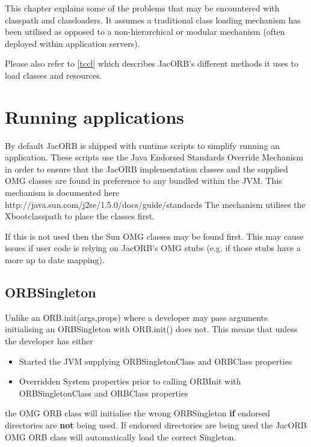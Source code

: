 %
%
\label{classloader}
This chapter explains some of the problems that may be encountered with classpath and classloaders.
It assumes a traditional class loading mechanism has been utilised as opposed
to a non-hierarchical or modular mechanism (often deployed within application servers).

Please also refer to \ref{tccl} which describes JacORB's different methods it uses to load classes and resources.

\section{Running applications}
\label{appRunningEndorsed}

By default JacORB is shipped with runtime scripts to simplify running
an application.  These scripts use the Java Endorsed Standards
Override Mechanism in order to ensure that the JacORB implementation
classes and the supplied OMG classes are found in preference to any
bundled within the JVM. This mechanism is documented here
http://java.sun.com/j2se/1.5.0/docs/guide/standards The mechanism
utilises the Xbootclasspath to place the classes first.

If this is not used then the Sun OMG classes may be found first. This may cause
issues if user code is relying on JacORB's OMG stubs (e.g. if those stubs have a
more up to date mapping).

\subsection{ORBSingleton}
Unlike an ORB.init(args,props) where a developer may pass arguments initialising
an ORBSingleton with ORB.init() does not. This means that unless the developer has
either

\begin{itemize}
\item Started the JVM supplying ORBSingletonClass and ORBClass properties
\item Overridden System properties prior to calling ORBInit with ORBSingletonClass and ORBClass properties
\end{itemize}

the OMG ORB class will initialise the wrong ORBSingleton \textbf{if} endorsed
directories are \textbf{not} being used. If endorsed directories are being used
the JacORB OMG ORB class will automatically load the correct Singleton.

